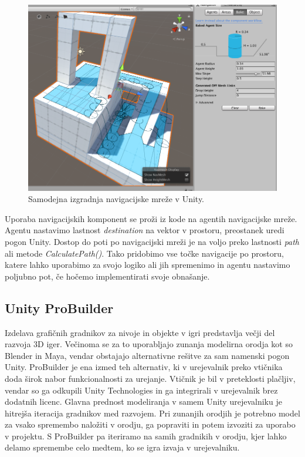 \documentclass[12pt,a4paper,twoside]{book}
\begin{document}
\begin{figure}[h]
	\centering
	\includegraphics[width=15cm]{navmesh}
	\caption{Samodejna izgradnja navigacijske mreže v Unity.}
	\label{slika:navmesh}
\end{figure}

Uporaba navigacijskih komponent se proži iz kode na agentih navigacijske mreže. Agentu nastavimo lastnost \textit{destination} na vektor v prostoru, preostanek uredi pogon Unity. Dostop do poti po navigacijski mreži je na voljo preko lastnosti \textit{path} ali metode \textit{CalculatePath()}. Tako pridobimo vse točke navigacije po prostoru, katere lahko uporabimo za svojo logiko ali jih spremenimo in agentu nastavimo poljubno pot, če hočemo implementirati svoje obnašanje. 

\subsection{Unity ProBuilder}
Izdelava grafičnih gradnikov za nivoje in objekte v igri predstavlja večji del razvoja 3D iger. Večinoma se za to uporabljajo zunanja modelirna orodja kot so Blender in Maya, vendar obstajajo alternativne rešitve za sam namenski pogon Unity. ProBuilder je ena izmed teh alternativ, ki v urejevalnik preko vtičnika doda širok nabor funkcionalnosti za urejanje. Vtičnik je bil v preteklosti plačljiv, vendar so ga odkupili Unity Technologies in ga integrirali v urejevalnik brez dodatnih licenc. Glavna prednost modeliranja v samem Unity urejevalniku je hitrejša iteracija gradnikov med razvojem. Pri zunanjih orodjih je potrebno model za vsako spremembo naložiti v orodju, ga popraviti in potem izvoziti za uporabo v projektu. S ProBuilder pa iteriramo na samih gradnikih v orodju, kjer lahko delamo spremembe celo medtem, ko se igra izvaja v urejevalniku.
\end{document}
